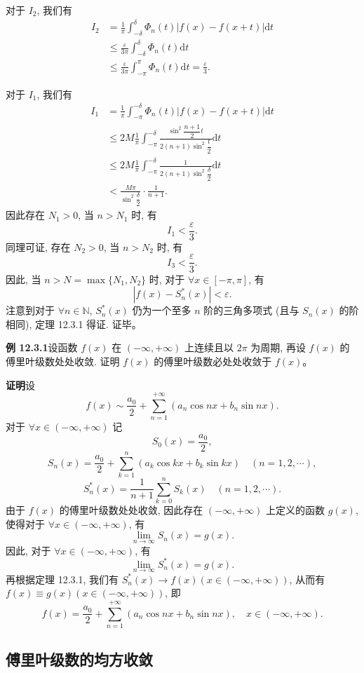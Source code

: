 \documentclass[UTF8,12pt,a4paper,fontset=fandol]{ctexart}
\begin{document}
对于 $I_2$, 我们有
\[
\begin{aligned}
  I_2
  &=\frac1\pi\int_{-\delta}^{\delta}\Phi_n(t)|f(x)-f(x+t)|\mathrm dt\\
  &\leqslant\frac{\varepsilon}{3\pi}\int_{-\delta}^{\delta}\Phi_n(t)\mathrm dt\\
  &\leqslant\frac{\varepsilon}{3\pi}\int_{-\pi}^{\pi}\Phi_n(t)\mathrm dt
  =\frac{\varepsilon}{3}.
\end{aligned}
\]

对于 $I_1$, 我们有
\[
\begin{aligned}
  I_1
  &=\frac1\pi\int_{-\pi}^{-\delta}\Phi_n(t)|f(x)-f(x+t)|\mathrm dt\\
  &\leqslant 2M\frac1\pi\int_{-\pi}^{-\delta}
  \frac{\sin^2\dfrac{n+1}{2}t}{2(n+1)\sin^2\dfrac t2}\mathrm dt\\
  &\leqslant 2M\frac1\pi\int_{-\pi}^{-\delta}
  \frac{1}{2(n+1)\sin^2\dfrac\delta2}\mathrm dt\\
  &<\frac{M\pi}{\sin^2\dfrac\delta2}\cdot\frac1{n+1}.
\end{aligned}
\]
因此存在 $N_1>0$, 当 $n>N_1$ 时, 有
\[
  I_1<\frac{\varepsilon}{3}.
\]
同理可证, 存在 $N_2>0$, 当 $n>N_2$ 时, 有
\[
  I_3<\frac{\varepsilon}{3}.
\]
因此, 当 $n>N=\max\{N_1,N_2\}$ 时, 对于 $\forall x\in[-\pi,\pi]$, 有
\[
  |f(x)-S_n^*(x)|<\varepsilon.
\]
注意到对于 $\forall n\in\mathbb N$, $S_n^*(x)$ 仍为一个至多 $n$ 阶的三角多项式 (且与 $S_n(x)$ 的阶相同), 定理 12.3.1 得证. 证毕。

\noindent\textbf{例 12.3.1}\quad 设函数 $f(x)$ 在 $(-\infty,+\infty)$ 上连续且以 $2\pi$ 为周期, 再设 $f(x)$ 的傅里叶级数处处收敛. 证明 $f(x)$ 的傅里叶级数必处处收敛于 $f(x)$。

\noindent\textbf{证明}\quad 设
\[
  f(x)\sim\frac{a_0}{2}+\sum_{n=1}^{+\infty}(a_n\cos nx+b_n\sin nx).
\]
对于 $\forall x\in(-\infty,+\infty)$ 记
\[
  S_0(x)=\frac{a_0}{2},
\]
\[
  S_n(x)=\frac{a_0}{2}+\sum_{k=1}^n(a_k\cos kx+b_k\sin kx)\quad(n=1,2,\cdots),
\]
\[
  S_n^*(x)=\frac1{n+1}\sum_{k=0}^nS_k(x)\quad(n=1,2,\cdots).
\]
由于 $f(x)$ 的傅里叶级数处处收敛, 因此存在 $(-\infty,+\infty)$ 上定义的函数 $g(x)$, 使得对于 $\forall x\in(-\infty,+\infty)$, 有
\[
  \lim_{n\to\infty}S_n(x)=g(x).
\]
因此, 对于 $\forall x\in(-\infty,+\infty)$, 有
\[
  \lim_{n\to\infty}S_n^*(x)=g(x).
\]
再根据定理 12.3.1, 我们有 $S_n^*(x)\to f(x)(x\in(-\infty,+\infty))$, 从而有 $f(x)\equiv g(x)(x\in(-\infty,+\infty))$, 即
\[
  f(x)=\frac{a_0}{2}+\sum_{n=1}^{+\infty}(a_n\cos nx+b_n\sin nx),\quad x\in(-\infty,+\infty).
\]

\subsection{傅里叶级数的均方收敛}
\end{document}
